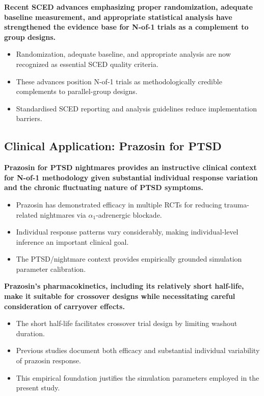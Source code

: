 \documentclass[
  11pt,
]{article}
\begin{document}
\textbf{Recent SCED advances emphasizing proper randomization, adequate baseline measurement, and appropriate statistical analysis have strengthened the evidence base for N-of-1 trials as a complement to group designs.}

\begin{itemize}\setlength{\itemsep}{2pt}\setlength{\parskip}{0pt}
\item Randomization, adequate baseline, and appropriate analysis are now recognized as essential SCED quality criteria.
\item These advances position N-of-1 trials as methodologically credible complements to parallel-group designs.
\item Standardised SCED reporting and analysis guidelines reduce implementation barriers.
\end{itemize}

\subsection{Clinical Application: Prazosin for PTSD}\label{clinical-application-prazosin-for-ptsd}

\textbf{Prazosin for PTSD nightmares provides an instructive clinical context for N-of-1 methodology given substantial individual response variation and the chronic fluctuating nature of PTSD symptoms.}

\begin{itemize}\setlength{\itemsep}{2pt}\setlength{\parskip}{0pt}
\item Prazosin has demonstrated efficacy in multiple RCTs for reducing trauma-related nightmares via $\alpha_1$-adrenergic blockade.
\item Individual response patterns vary considerably, making individual-level inference an important clinical goal.
\item The PTSD/nightmare context provides empirically grounded simulation parameter calibration.
\end{itemize}

\textbf{Prazosin's pharmacokinetics, including its relatively short half-life, make it suitable for crossover designs while necessitating careful consideration of carryover effects.}

\begin{itemize}\setlength{\itemsep}{2pt}\setlength{\parskip}{0pt}
\item The short half-life facilitates crossover trial design by limiting washout duration.
\item Previous studies document both efficacy and substantial individual variability of prazosin response.
\item This empirical foundation justifies the simulation parameters employed in the present study.
\end{itemize}
\end{document}
